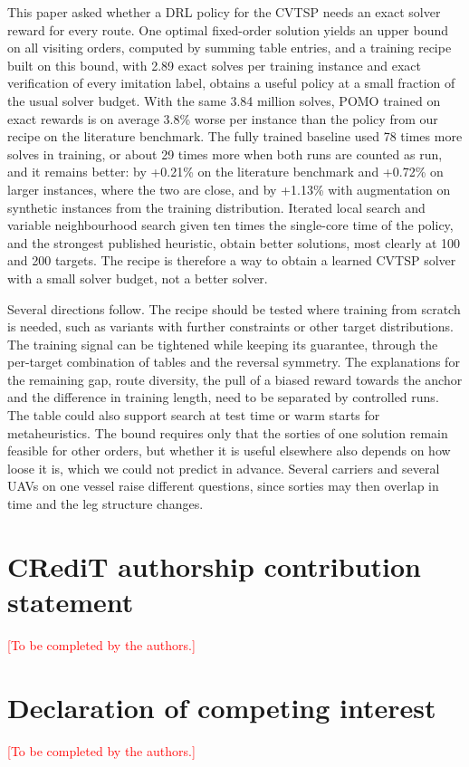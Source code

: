\documentclass[preprint,12pt,authoryear]{elsarticle}
\newcommand{\placeholder}[1]{\textcolor{red}{[#1]}}
\begin{document}
This paper asked whether a DRL policy for the CVTSP needs an exact solver reward for every route. One optimal fixed-order solution yields an upper bound on all visiting orders, computed by summing table entries, and a training recipe built on this bound, with 2.89 exact solves per training instance and exact verification of every imitation label, obtains a useful policy at a small fraction of the usual solver budget. With the same 3.84 million solves, POMO trained on exact rewards is on average 3.8\% worse per instance than the policy from our recipe on the literature benchmark. The fully trained baseline used 78 times more solves in training, or about 29 times more when both runs are counted as run, and it remains better: by +0.21\% on the literature benchmark and +0.72\% on larger instances, where the two are close, and by +1.13\% with augmentation on synthetic instances from the training distribution. Iterated local search and variable neighbourhood search given ten times the single-core time of the policy, and the strongest published heuristic, obtain better solutions, most clearly at 100 and 200 targets. The recipe is therefore a way to obtain a learned CVTSP solver with a small solver budget, not a better solver.

Several directions follow. The recipe should be tested where training from scratch is needed, such as variants with further constraints or other target distributions. The training signal can be tightened while keeping its guarantee, through the per-target combination of tables and the reversal symmetry. The explanations for the remaining gap, route diversity, the pull of a biased reward towards the anchor and the difference in training length, need to be separated by controlled runs. The table could also support search at test time or warm starts for metaheuristics. The bound requires only that the sorties of one solution remain feasible for other orders, but whether it is useful elsewhere also depends on how loose it is, which we could not predict in advance. Several carriers \citep{fahradyan2020} and several UAVs on one vessel \citep{ren2026} raise different questions, since sorties may then overlap in time and the leg structure changes.

\section*{CRediT authorship contribution statement}
\placeholder{To be completed by the authors.}

\section*{Declaration of competing interest}
\placeholder{To be completed by the authors.}
\end{document}
